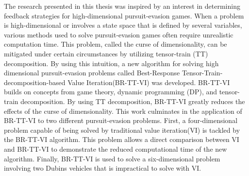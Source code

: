 % 
% 
%
The research presented in this thesis was inspired by an interest in determining feedback strategies for high-dimensional pursuit-evasion games. When a problem is high-dimensional or involves a state space that is defined by several variables, various methods used to solve pursuit-evasion games often require unrealistic computation time. This problem, called the curse of dimensionality, can be mitigated under certain circumstances by utilizing tensor-train (TT) decomposition. By using this intuition, a new algorithm for solving high dimensional pursuit-evasion problems called Best-Response Tensor-Train-decomposition-based Value Iteration(BR-TT-VI) was developed. BR-TT-VI builds on concepts from game theory, dynamic programming (DP), and tensor-train decomposition. By using TT decomposition, BR-TT-VI greatly reduces the effects of the curse of dimensionality. This work culminates in the application of BR-TT-VI to two different pursuit-evasion problems. First, a four-dimensional problem capable of being solved by traditional value iteration(VI) is tackled by the BR-TT-VI algorithm. This problem allows a direct comparison between VI and BR-TT-VI to demonstrate the reduced computational time of the new algorithm. Finally, BR-TT-VI is used to solve a six-dimensional problem involving two Dubins vehicles that is impractical to solve with VI.   
